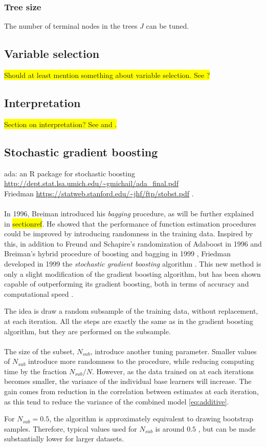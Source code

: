 \subsubsection{Tree size}
\label{sub:Tree size}
The number of terminal nodes in the trees $J$ can be tuned.


\subsection{Variable selection}
\label{sub:Variable selection}
\colorbox{yellow}{Should at least mention something about variable selection. See \cite[sec. 8.1]{friedman}?}

\subsection{Interpretation}
\label{sub:Interpretation}
\colorbox{yellow}{Section on interpretation? See \cite[10.3]{modstat} and \cite{friedman}.}

\subsection{Stochastic gradient boosting}
\label{sub:Stochastic gradient boosting}
ada: an R package for stochastic boosting \url{http://dept.stat.lsa.umich.edu/~gmichail/ada_final.pdf} \\
Friedman \url{https://statweb.stanford.edu/~jhf/ftp/stobst.pdf} \cite{FriedmanStochBoost}. \\
\\
In 1996, Breiman \cite{Breiman1996} introduced his \textit{bagging} procedure, as will be further explained in  \colorbox{yellow}{sectionref}. He showed that the performance of function estimation procedures could be improved by introducing randomness in the training data. Inspired by this, in addition to Freund and Schapire's randomization of Adaboost in 1996 \cite{freund1996} and Breiman's hybrid procedure of boosting and bagging in 1999 \cite{breiman1999}, Friedman developed in 1999 the \textit{stochastic gradient boosting} algorithm \cite{FriedmanStochBoost}.
This new method is only a slight modification of the gradient boosting algorithm, but has been shown capable of outperforming its gradient boosting, both in terms of accuracy and computational speed  \cite{FriedmanStochBoost}.

The idea is draw a random subsample of the training data, without replacement, at each iteration. All the steps are exactly the same as in the gradient boosting algorithm, but they are performed on the subsample. \\
\\
The size of the subset, $N_{sub}$, introduce another tuning parameter. Smaller values of $N_{sub}$ introduce more randomness to the procedure, while reducing computing time by the fraction $N_{sub}/N$. However, as the data trained on at each iterations becomes smaller, the variance of the individual base learners will increase. The gain comes from reduction in the correlation between estimates at each iteration, as this tend to reduce the variance of the combined model \eqref{eq:additive}.

For $N_{sub} = 0.5$, the algorithm is approximately equivalent to drawing bootstrap samples. Therefore, typical values used for $N_{sub}$ is around $0.5$ \cite{modstat}, but can be made substantially lower for larger datasets.

